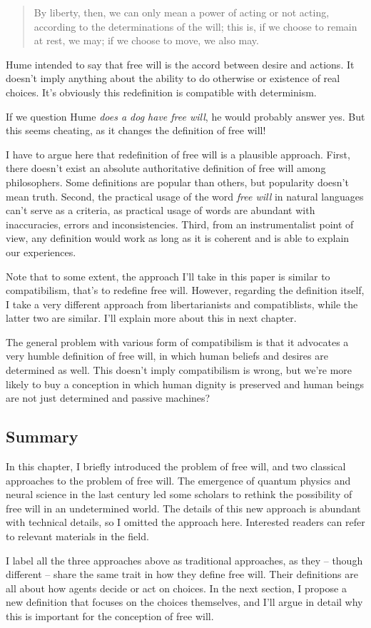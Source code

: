 \begin{quote}
By liberty, then, we can only mean a power of acting or not acting, according to the determinations of the will; this is, if we choose to remain at rest, we may; if we choose to move, we also may.
\end{quote}

Hume intended to say that free will is the accord between desire and actions. It doesn't imply anything about the ability to do otherwise or existence of real choices. It's obviously this redefinition is compatible with determinism.

If we question Hume \emph{does a dog have free will}, he would probably answer yes. But this seems cheating, as it changes the definition of free will!

I have to argue here that redefinition of free will is a plausible approach. First, there doesn't exist an absolute authoritative definition of free will among philosophers. Some definitions are popular than others, but popularity doesn't mean truth. Second, the practical usage of the word \emph{free will} in natural languages can't serve as a criteria, as practical usage of words are abundant with inaccuracies,  errors and inconsistencies. Third, from an instrumentalist point of view, any definition would work as long as it is coherent and is able to explain our experiences.

Note that to some extent, the approach I'll take in this paper is similar to compatibilism, that's to redefine free will. However, regarding the definition itself, I take a very different approach from libertarianists and compatiblists, while the latter two are similar. I'll explain more about this in next chapter.

The general problem with various form of compatibilism is that it advocates a very humble definition of free will, in which human beliefs and desires are determined as well. This doesn't imply compatibilism is wrong, but we're more likely to buy a conception in which human dignity is preserved and human beings are not just determined and passive machines?

\subsection{Summary}

In this chapter, I briefly introduced the problem of free will, and two classical approaches to the problem of free will. The emergence of quantum physics and neural science in the last century led some scholars to rethink the possibility of free will in an undetermined world. The details of this new approach is abundant with technical details, so I omitted the approach here. Interested readers can refer to relevant materials in the field.

I label all the three approaches above as traditional approaches, as they -- though different -- share the same trait in how they define free will. Their definitions are all about how agents decide or act on choices. In the next section, I propose a new definition that focuses on the choices themselves, and I'll argue in detail why this is important for the conception of free will.

